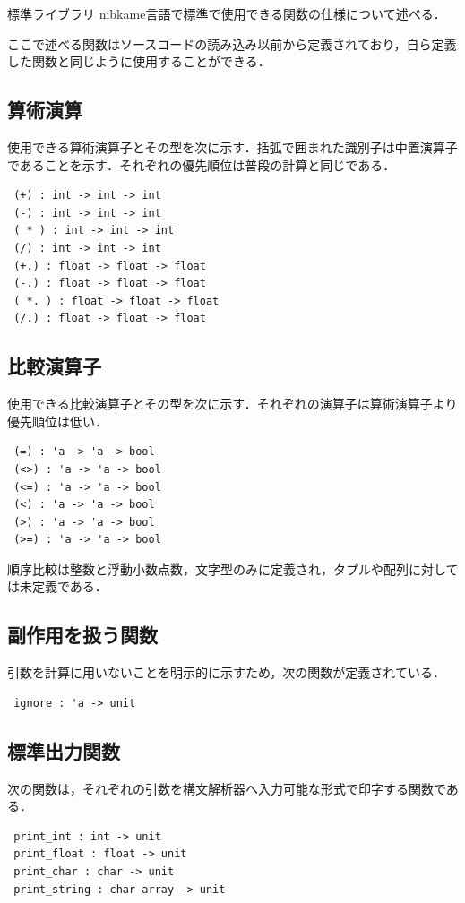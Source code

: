 \documentclass[a4paper,titlepage,report,disablejfam]{jsbook}
\begin{document}
\begin{resbonsiblesection}{標準ライブラリ}{\kobori}
nibkame言語で標準で使用できる関数の仕様について述べる．

ここで述べる関数はソースコードの読み込み以前から定義されており，自ら定義
した関数と同じように使用することができる．

\subsection{算術演算}
使用できる算術演算子とその型を次に示す．括弧で囲まれた識別子は中置演算子
であることを示す．それぞれの優先順位は普段の計算と同じである．
\begin{lstlisting}
 (+) : int -> int -> int
 (-) : int -> int -> int
 ( * ) : int -> int -> int
 (/) : int -> int -> int
 (+.) : float -> float -> float
 (-.) : float -> float -> float
 ( *. ) : float -> float -> float
 (/.) : float -> float -> float
\end{lstlisting}

\subsection{比較演算子}
使用できる比較演算子とその型を次に示す．それぞれの演算子は算術演算子より
優先順位は低い．
\begin{lstlisting}
 (=) : 'a -> 'a -> bool
 (<>) : 'a -> 'a -> bool
 (<=) : 'a -> 'a -> bool
 (<) : 'a -> 'a -> bool
 (>) : 'a -> 'a -> bool
 (>=) : 'a -> 'a -> bool
\end{lstlisting}
順序比較は整数と浮動小数点数，文字型のみに定義され，タプルや配列に対して
は未定義である．

\subsection{副作用を扱う関数}
引数を計算に用いないことを明示的に示すため，次の関数が定義されている．
\begin{lstlisting}
 ignore : 'a -> unit
\end{lstlisting}

\subsection{標準出力関数}
次の関数は，それぞれの引数を構文解析器へ入力可能な形式で印字する関数であ
る．
\begin{lstlisting}
 print_int : int -> unit
 print_float : float -> unit
 print_char : char -> unit
 print_string : char array -> unit
\end{lstlisting}


\end{resbonsiblesection}
\end{document}
